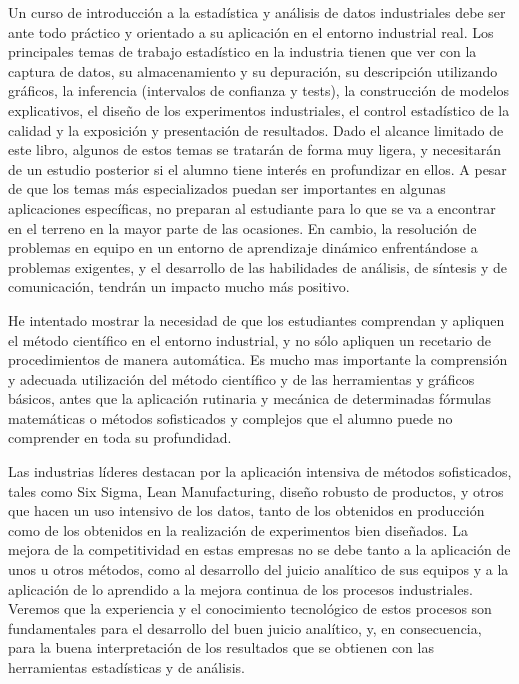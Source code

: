 \documentclass[
  letterpaper,
  DIV=11,
  numbers=noendperiod,
  oneside]{scrreprt}
\begin{document}
Un curso de introducción a la estadística y análisis de datos
industriales debe ser ante todo práctico y orientado a su aplicación en
el entorno industrial real. Los principales temas de trabajo estadístico
en la industria tienen que ver con la captura de datos, su
almacenamiento y su depuración, su descripción utilizando gráficos, la
inferencia (intervalos de confianza y tests), la construcción de modelos
explicativos, el diseño de los experimentos industriales, el control
estadístico de la calidad y la exposición y presentación de resultados.
Dado el alcance limitado de este libro, algunos de estos temas se
tratarán de forma muy ligera, y necesitarán de un estudio posterior si
el alumno tiene interés en profundizar en ellos. A pesar de que los
temas más especializados puedan ser importantes en algunas aplicaciones
específicas, no preparan al estudiante para lo que se va a encontrar en
el terreno en la mayor parte de las ocasiones. En cambio, la resolución
de problemas en equipo en un entorno de aprendizaje dinámico
enfrentándose a problemas exigentes, y el desarrollo de las habilidades
de análisis, de síntesis y de comunicación, tendrán un impacto mucho más
positivo.

He intentado mostrar la necesidad de que los estudiantes comprendan y
apliquen el método científico en el entorno industrial, y no sólo
apliquen un recetario de procedimientos de manera automática. Es mucho
mas importante la comprensión y adecuada utilización del método
científico y de las herramientas y gráficos básicos, antes que la
aplicación rutinaria y mecánica de determinadas fórmulas matemáticas o
métodos sofisticados y complejos que el alumno puede no comprender en
toda su profundidad.

Las industrias líderes destacan por la aplicación intensiva de métodos
sofisticados, tales como Six Sigma, Lean Manufacturing, diseño robusto
de productos, y otros que hacen un uso intensivo de los datos, tanto de
los obtenidos en producción como de los obtenidos en la realización de
experimentos bien diseñados. La mejora de la competitividad en estas
empresas no se debe tanto a la aplicación de unos u otros métodos, como
al desarrollo del juicio analítico de sus equipos y a la aplicación de
lo aprendido a la mejora continua de los procesos industriales. Veremos
que la experiencia y el conocimiento tecnológico de estos procesos son
fundamentales para el desarrollo del buen juicio analítico, y, en
consecuencia, para la buena interpretación de los resultados que se
obtienen con las herramientas estadísticas y de análisis.
\end{document}
